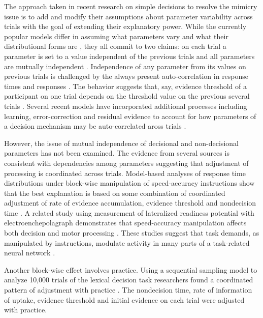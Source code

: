 \documentclass[12pt]{article}
\begin{document}
The approach taken in recent research on simple decisions to resolve the mimicry issue is to add and modify their assumptions about parameter variability across trials with the goal of extending their explanatory power. While the currently popular models differ in assuming what parameters vary and what their distributional forms are \citep{JonDzh2014}, they all commit to two claims: on each trial a parameter is set to a value independent of the previous trials and all parameters are mutually independent \citep{UshMcc2001,RatTue2002,BroHea2008}. Independence of any parameter from its values on previous trials is challenged by the always present auto-correlation in response times and responses \citep{JonCur2013}. The behavior suggests that, say, evidence threshold of a participant on one trial depends on the threshold value on the previous several trials \citep{VanMal2004}. Several recent models have incorporated additional processes including learning, error-correction and residual evidence to account for how parameters of a decision mechanism may be auto-correlated aross trials \citep{ChoNys2002,PerVan2002,GaoWon2009,GolWon2012}.

However, the issue of mutual independence of decisional and non-decisional parameters has not been examined. The evidence from several sources is consistent with dependencies among parameters suggesting that adjustment of processing is coordinated across trials. Model-based analyses of response time distributions under block-wise manipulation of speed-accuracy instructions show that the best explanation is based on some combination of coordinated adjustment of rate of evidence accumulation, evidence threshold and nondecision time \citep{VanTue2007,VanTue2011,ZhaRow2014,RaeHea2014}. A related study using measurement of lateralized readiness potential with electroenchepolagraph demonstrates that speed-accuracy manipulation affects both decision and motor processing \citep{RinOsm2004}. These studies suggest that task demands, as manipulated by instructions, modulate activity in many parts of a task-related neural network \citep{HarSch2011,TurFor2013,ColBas2014}.

Another block-wise effect involves practice. Using a sequential sampling model to analyze 10,000 trials of the lexical decision task researchers found a coordinated pattern of adjustment with practice \citep{DutVan2009}. The nondecision time, rate of information of uptake, evidence threshold and initial evidence on each trial were adjusted with practice. 
\end{document}
